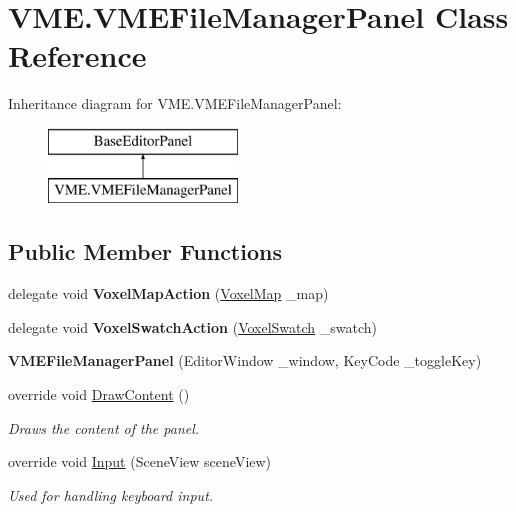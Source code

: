 \hypertarget{class_v_m_e_1_1_v_m_e_file_manager_panel}{}\section{V\+M\+E.\+V\+M\+E\+File\+Manager\+Panel Class Reference}
\label{class_v_m_e_1_1_v_m_e_file_manager_panel}
Inheritance diagram for V\+M\+E.\+V\+M\+E\+File\+Manager\+Panel\+:\begin{figure}[H]
\begin{center}
\leavevmode
\includegraphics[height=2.000000cm]{class_v_m_e_1_1_v_m_e_file_manager_panel}
\end{center}
\end{figure}
\subsection*{Public Member Functions}
\begin{DoxyCompactItemize}
\item 
delegate void {\bfseries Voxel\+Map\+Action} (\hyperlink{class_voxel_map}{Voxel\+Map} \+\_\+map)\hypertarget{class_v_m_e_1_1_v_m_e_file_manager_panel_ab7337fc7b9361e273e2b708c11f04993}{}\label{class_v_m_e_1_1_v_m_e_file_manager_panel_ab7337fc7b9361e273e2b708c11f04993}

\item 
delegate void {\bfseries Voxel\+Swatch\+Action} (\hyperlink{class_voxel_swatch}{Voxel\+Swatch} \+\_\+swatch)\hypertarget{class_v_m_e_1_1_v_m_e_file_manager_panel_a01f2f73954d5080ff98c87e328495014}{}\label{class_v_m_e_1_1_v_m_e_file_manager_panel_a01f2f73954d5080ff98c87e328495014}

\item 
{\bfseries V\+M\+E\+File\+Manager\+Panel} (Editor\+Window \+\_\+window, Key\+Code \+\_\+toggle\+Key)\hypertarget{class_v_m_e_1_1_v_m_e_file_manager_panel_ad294f448fa6fb637dd8512727326f8d8}{}\label{class_v_m_e_1_1_v_m_e_file_manager_panel_ad294f448fa6fb637dd8512727326f8d8}

\item 
override void \hyperlink{class_v_m_e_1_1_v_m_e_file_manager_panel_a328194babcf088ee2e1a4ab89deeb916}{Draw\+Content} ()
\begin{DoxyCompactList}\small\item\em Draws the content of the panel. \end{DoxyCompactList}\item 
override void \hyperlink{class_v_m_e_1_1_v_m_e_file_manager_panel_ac39bb43df82776379e2f31c67b0ced93}{Input} (Scene\+View scene\+View)
\begin{DoxyCompactList}\small\item\em Used for handling keyboard input. \end{DoxyCompactList}\end{DoxyCompactItemize}
